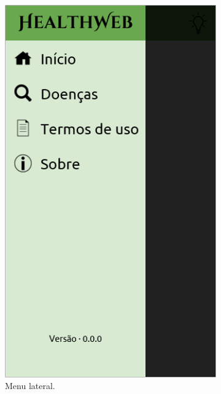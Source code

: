 \begin{figure}[htbp]
	\centering
	\begin{subfigure}{0.24\linewidth}
		\centering
		\includegraphics[width=\linewidth]{figure/prototype/mobile/drawer.png}
		\caption{Menu lateral.}
		\label{fig:mobile:drawer}
	\end{subfigure}
	\hfill
	\begin{subfigure}{0.24\linewidth}
		\centering

\end{subfigure}
\end{figure}
